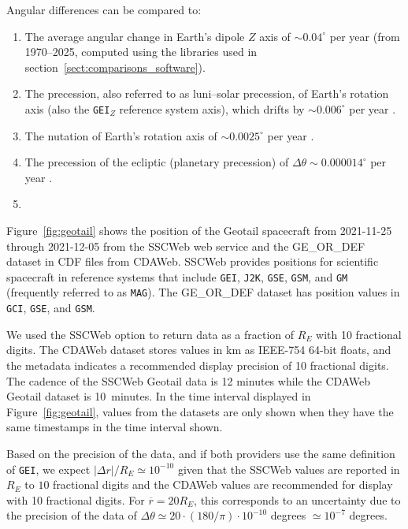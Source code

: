 \documentclass[draft]{agujournal2019}
\begin{document}
\noindent Angular differences can be compared to:
\begin{enumerate}
    \item The average angular change in Earth's dipole $Z$ axis of ${\sim} 0.04^\circ$ per year (from 1970--2025, computed using the libraries used in section~\ref{sect:comparisons_software}).

    \item The precession, also referred to as luni--solar precession, of Earth's rotation axis (also the \texttt{GEI}$_Z$ reference system axis), which drifts by ${\sim} 0.006^\circ$ per year \cite{Hapgood1995}.

    \item The nutation of Earth's rotation axis of ${\sim} 0.0025^\circ$ per year \cite{Hapgood1995}.

    \item The precession of the ecliptic (planetary precession) of $\Delta \theta {\sim} 0.000014^\circ$ per year \cite{Hapgood1995}.

    \item {}
\end{enumerate}

Figure~\ref{fig:geotail} shows the position of the Geotail spacecraft from 2021-11-25 through 2021-12-05 from the SSCWeb web service and the GE\_OR\_DEF dataset in CDF \cite{CDF2025} files from CDAWeb. SSCWeb provides positions for scientific spacecraft in reference systems that include \texttt{GEI}, \texttt{J2K}, \texttt{GSE}, \texttt{GSM}, and \texttt{GM} (frequently referred to as \texttt{MAG}). The GE\_OR\_DEF dataset has position values in \texttt{GCI}, \texttt{GSE}, and \texttt{GSM}.

We used the SSCWeb option to return data as a fraction of $R_E$ with 10 fractional digits. The CDAWeb dataset stores values in km as IEEE-754 64-bit floats, and the metadata indicates a recommended display precision of 10 fractional digits. The cadence of the SSCWeb Geotail data is 12 minutes while the CDAWeb Geotail dataset is 10~minutes. In the time interval displayed in Figure~\ref{fig:geotail}, values from the datasets are only shown when they have the same timestamps in the time interval shown.

Based on the precision of the data, and if both providers use the same definition of \texttt{GEI}, we expect $|\Delta r|/R_E \simeq 10^{-10}$ given that the SSCWeb values are reported in $R_E$ to $10$ fractional digits and the CDAWeb values are recommended for display with 10 fractional digits. For $\overline{r}=20 R_E$, this corresponds to an uncertainty due to the precision of the data of $\Delta \theta \simeq 20\cdot (180/\pi) \cdot 10^{-10}$ degrees $\simeq 10^{-7}$ degrees.
\end{document}
